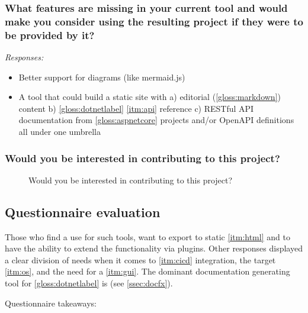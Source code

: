 \subsubsection*{What features are missing in your current tool and would make you consider using the resulting project if they were to be provided by it?}

\textit{Responses:}
\begin{itemize}
    \item Better support for diagrams (like mermaid.js)
    \item A tool that could build a static site with a) editorial (\ref{gloss:markdown}) content b) \ref{gloss:dotnetlabel} \ref{itm:api} reference c) RESTful API documentation from \ref{gloss:aspnetcore} projects and/or OpenAPI definitions all under one umbrella
\end{itemize}

\subsubsection*{Would you be interested in contributing to this project?}

\begin{figure}[H]
    \centering
    \caption{Would you be interested in contributing to this project?}
\end{figure}

\subsection{Questionnaire evaluation} \label{ssec:questionnaireeval}

Those who find a use for such tools, want to export to static \ref{itm:html} and to have the ability to extend the functionality via plugins.
Other responses displayed a clear division of needs when it comes to \ref{itm:cicd} integration, the target \ref{itm:os}, and the need for a \ref{itm:gui}.
The dominant documentation generating tool for \ref{gloss:dotnetlabel} is  (see \ref{ssec:docfx}).

Questionnaire takeaways:

